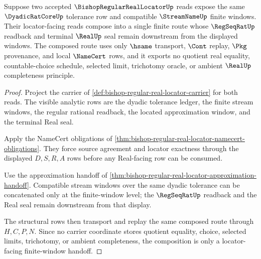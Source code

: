 \begin{theorem}
\label{thm:bishop-regular-real-locator-window-composition}
Suppose two accepted $\BishopRegularRealLocatorUp$ reads expose the same $\DyadicRatCoreUp$ tolerance row and compatible $\StreamNameUp$ finite windows. Their locator-facing reads compose into a single finite route whose $\RegSeqRatUp$ readback and terminal $\RealUp$ seal remain downstream from the displayed windows. The composed route uses only $\hsame$ transport, $\Cont$ replay, $\Pkg$ provenance, and local $\NameCert$ rows, and it exports no quotient real equality, countable-choice schedule, selected limit, trichotomy oracle, or ambient $\RealUp$ completeness principle.
\end{theorem}
\begin{proof}
Project the carrier of \autoref{def:bishop-regular-real-locator-carrier} for both reads. The visible analytic rows are the dyadic tolerance ledger, the finite stream windows, the regular rational readback, the located approximation window, and the terminal Real seal.

Apply the NameCert obligations of \autoref{thm:bishop-regular-real-locator-namecert-obligations}. They force source agreement and locator exactness through the displayed $D,S,R,A$ rows before any Real-facing row can be consumed.

Use the approximation handoff of \autoref{thm:bishop-regular-real-locator-approximation-handoff}. Compatible stream windows over the same dyadic tolerance can be concatenated only at the finite-window level; the $\RegSeqRatUp$ readback and the Real seal remain downstream from that display.

The structural rows then transport and replay the same composed route through $H,C,P,N$. Since no carrier coordinate stores quotient equality, choice, selected limits, trichotomy, or ambient completeness, the composition is only a locator-facing finite-window handoff.
\end{proof}



